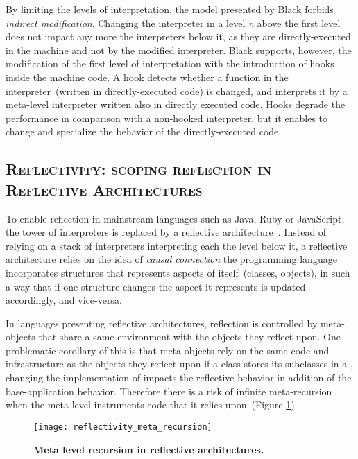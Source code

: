 By limiting the levels of interpretation, the model presented by Black forbids \emph{indirect modification}. Changing the interpreter in a level \emph{n} above the first level does not impact any more the interpreters below it, as they are directly-executed in the machine and not by the modified interpreter. Black supports, however, the modification of the first level of interpretation with the introduction of hooks inside the machine code. A hook detects whether a function in the interpreter~(written in directly-executed code) is changed, and interprets it by a meta-level interpreter written also in directly executed code. Hooks degrade the performance in comparison with a non-hooked interpreter, but it enables to change and specialize the behavior of the directly-executed code.

\subsection*{\textsc{Reflectivity: scoping reflection in Reflective Architectures}}

To enable reflection in mainstream languages such as Java, Ruby or JavaScript, the tower of interpreters is replaced by a reflective architecture~\cite{Maes87a}. Instead of relying on a stack of interpreters interpreting each the level below it, a reflective architecture relies on the idea of \emph{causal connection} \ie the programming language incorporates structures that represents aspects of itself~(\eg classes, objects), in such a way that if one structure changes the aspect it represents is updated accordingly, and vice-versa.


In languages presenting reflective architectures, reflection is controlled by meta-objects that share a same environment with the objects they reflect upon.
One problematic corollary of this is that meta-objects rely on the same code and infrastructure as the objects they reflect upon \eg if a class stores its subclasses in a , changing the  implementation of  impacts the reflective behavior in addition of the base-application behavior.
Therefore there is a risk of infinite meta-recursion when the meta-level instruments code that it relies upon~(Figure \ref{fig:reflectivity_meta_recursion}).

\begin{figure}[ht]
\begin{center}
\texttt{[image: reflectivity\_meta\_recursion]}
\caption{\textbf{Meta level recursion in reflective architectures.}\label{fig:reflectivity_meta_recursion}
 }
\end{center}
\end{figure}

